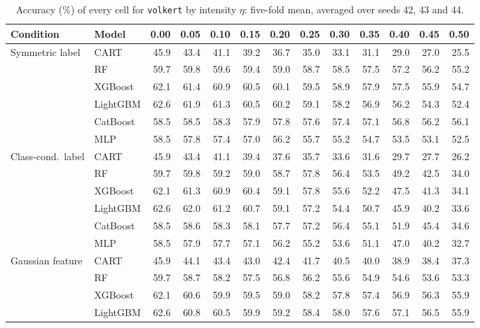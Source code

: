 \begin{table}[p]
\centering
\tiny
\setlength{\tabcolsep}{2.6pt}
\caption{Accuracy (\%) of every cell for \texttt{volkert} by intensity $\eta$: five-fold mean, averaged over seeds 42, 43 and 44.}
\label{tab:grid_volkert}
\begin{tabular}{@{}llrrrrrrrrrrr@{}}
\toprule
Condition & Model & 0.00 & 0.05 & 0.10 & 0.15 & 0.20 & 0.25 & 0.30 & 0.35 & 0.40 & 0.45 & 0.50 \\
\midrule
Symmetric label & CART & 45.9 & 43.4 & 41.1 & 39.2 & 36.7 & 35.0 & 33.1 & 31.1 & 29.0 & 27.0 & 25.5 \\
 & RF & 59.7 & 59.8 & 59.6 & 59.4 & 59.0 & 58.7 & 58.5 & 57.5 & 57.2 & 56.2 & 55.2 \\
 & XGBoost & 62.1 & 61.4 & 60.9 & 60.5 & 60.1 & 59.5 & 58.9 & 57.9 & 57.5 & 55.9 & 54.7 \\
 & LightGBM & 62.6 & 61.9 & 61.3 & 60.5 & 60.2 & 59.1 & 58.2 & 56.9 & 56.2 & 54.3 & 52.4 \\
 & CatBoost & 58.5 & 58.5 & 58.3 & 57.9 & 57.8 & 57.6 & 57.4 & 57.1 & 56.8 & 56.2 & 56.1 \\
 & MLP & 58.5 & 57.8 & 57.4 & 57.0 & 56.2 & 55.7 & 55.2 & 54.7 & 53.5 & 53.1 & 52.5 \\
\midrule
Class-cond.\ label & CART & 45.9 & 43.4 & 41.1 & 39.4 & 37.6 & 35.7 & 33.6 & 31.6 & 29.7 & 27.7 & 26.2 \\
 & RF & 59.7 & 59.8 & 59.2 & 59.0 & 58.7 & 57.8 & 56.4 & 53.5 & 49.2 & 42.5 & 34.0 \\
 & XGBoost & 62.1 & 61.3 & 60.9 & 60.4 & 59.1 & 57.8 & 55.6 & 52.2 & 47.5 & 41.3 & 34.1 \\
 & LightGBM & 62.6 & 62.0 & 61.2 & 60.7 & 59.1 & 57.2 & 54.4 & 50.7 & 45.9 & 40.2 & 33.6 \\
 & CatBoost & 58.5 & 58.6 & 58.3 & 58.1 & 57.7 & 57.2 & 56.4 & 55.1 & 51.9 & 45.4 & 34.6 \\
 & MLP & 58.5 & 57.9 & 57.7 & 57.1 & 56.2 & 55.2 & 53.6 & 51.1 & 47.0 & 40.2 & 32.7 \\
\midrule
Gaussian feature & CART & 45.9 & 44.1 & 43.4 & 43.0 & 42.4 & 41.7 & 40.5 & 40.0 & 38.9 & 38.4 & 37.3 \\
 & RF & 59.7 & 58.7 & 58.2 & 57.5 & 56.8 & 56.2 & 55.6 & 54.9 & 54.6 & 53.6 & 53.3 \\
 & XGBoost & 62.1 & 60.6 & 59.9 & 59.5 & 59.0 & 58.2 & 57.8 & 57.4 & 56.9 & 56.3 & 55.9 \\
 & LightGBM & 62.6 & 60.8 & 60.5 & 59.9 & 59.2 & 58.4 & 58.0 & 57.6 & 57.1 & 56.5 & 55.9 \\

\end{tabular}
\end{table}
